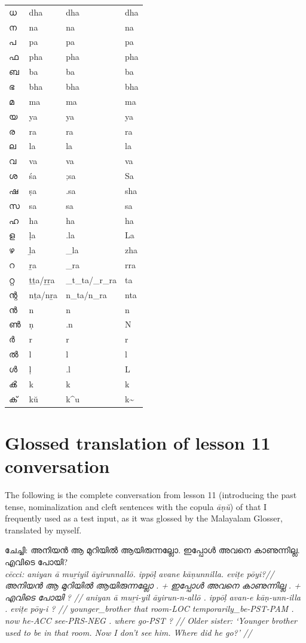 \documentclass[a4paper]{article}
\begin{document}
\begin{longtable}[l]{p{2.3cm} p{2.3cm} p{2.3cm} p{2.3cm}}
ധ & dha & dha & dha \\
ന & na & na & na \\
പ & pa & pa & pa \\
ഫ & pha & pha & pha \\
ബ & ba & ba & ba \\
ഭ & bha & bha & bha \\
മ & ma & ma & ma \\
യ & ya & ya & ya \\
ര & ra & ra & ra \\
ല & la & la & la \\
വ & va & va & va \\
ശ & śa & ;sa & Sa \\
ഷ & ṣa & .sa & sha \\
സ & sa & sa & sa \\
ഹ & ha & ha & ha \\
ള & ḷa & .la & La \\
ഴ & ḻa & \_la & zha \\
റ & ṟa & \_ra & rra \\
റ്റ & ṯṯa/ṟṟa & \_t\_ta/\_r\_ra & ta \\
ന്റ & nṯa/nṟa & n\_ta/n\_ra & nta \\
ൻ & n & n & n \\
ൺ & ṇ & .n & N \\
ർ & r & r & r \\
ൽ & l & l & l \\
ൾ & ḷ & .l & L \\
ൿ & k & k & k \\
ക് & kŭ & k\^{}u & k\textasciitilde \\
\end{longtable}

\section{Glossed translation of lesson 11 conversation}

The following is the complete conversation from lesson 11 (introducing the past tense, nominalization and cleft sentences with the copula \textit{āṇŭ}) of \textcite{moag} that I frequently used as a test input, as it was glossed by the Malayalam Glosser, translated by myself.

\ex\begingl
\glpreamble ചേച്ചി: അനിയൻ ആ മുറിയിൽ ആയിരുന്നല്ലോ. ഇപ്പോൾ അവനെ കാണുന്നില്ല. എവിടെ പോയി? \\
\itshape cēcci: aniyan ā muṟiyil āyirunnallō. ippōḷ avane kāṇunnilla. eviṭe pōyi?//
\gla അനിയൻ ആ മുറിയിൽ ആയിരുന്നല്ലോ . + ഇപ്പോൾ അവനെ കാണുന്നില്ല . + എവിടെ പോയി ? //
\glb aniyan ā muṟi-yil āyirun-n-allō . ippōḷ avan-e kāṇ-unn-illa . eviṭe pōy-i ? //
\glc younger\_brother that room-LOC temporarily\_be-PST-PAM . now he-ACC see-PRS-NEG . where go-PST ? //
\glft Older sister: `Younger brother used to be in that room. Now I don't see him. Where did he go?' //
\endgl\xe
\end{document}
